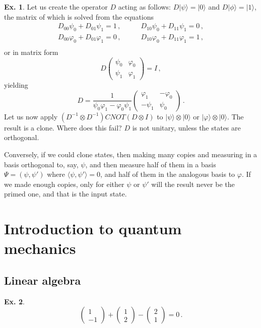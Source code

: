 \documentclass[a4paper,12pt]{article}
\theoremstyle{definition}
\newtheorem{exercise}{Ex.}[section]
\begin{document}
\begin{exercise} Let us create the operator $D$ acting as follows: $D|\psi\rangle = |0\rangle$ and $D|\phi\rangle = |1\rangle$, the matrix of which is solved from the equations
\[
 \begin{aligned}
  D_{00}\psi_0 + D_{01}\psi_1 = 1\,,&\quad\quad D_{10}\psi_0 + D_{11}\psi_1 = 0\,,\\
  D_{00}\varphi_0 + D_{01}\varphi_1 = 0\,,&\quad\quad D_{10}\varphi_0 + D_{11}\varphi_1 = 1\,,\\
 \end{aligned}
\]
or in matrix form
\[
 D\begin{pmatrix} \psi_0 & \varphi_0 \\ \psi_1 & \varphi_1 \end{pmatrix} = I\,,
\]
yielding
\[
 D = \frac{1}{\psi_0\varphi_1 - \varphi_0\psi_1}
 \begin{pmatrix} \varphi_1 & -\varphi_0 \\ -\psi_1 & \psi_0\end{pmatrix}\,.
\]
Let us now apply $(D^{-1}\otimes D^{-1}) CNOT (D\otimes I)$ to $|\psi\rangle \otimes |0\rangle$ or $|\varphi\rangle\otimes |0\rangle$. The result is a clone. Where does this fail? $D$ is not unitary, unless the states are orthogonal.

Conversely, if we could clone states, then making many copies and measuring in a basis orthogonal to, say, $\psi$, and then measure half of them in a basis $\Psi=(\psi,\psi')$ where $\langle \psi,\psi'\rangle=0$, and half of them in the analogous basis to $\varphi$. If we made enough copies, only for either $\psi$ or $\psi'$ will the result never be the primed one, and that is the input state.
\end{exercise}

\section{Introduction to quantum mechanics}\label{ssec:IntroductionToQM}

\subsection{Linear algebra}\label{ssec:linearAlgebra}

\begin{exercise}
\[
 \begin{pmatrix} 1 \\ -1 \end{pmatrix}
 + \begin{pmatrix} 1 \\ 2 \end{pmatrix}
 - \begin{pmatrix} 2 \\ 1 \end{pmatrix} = 0\,.
\]
\end{exercise}
\end{document}
